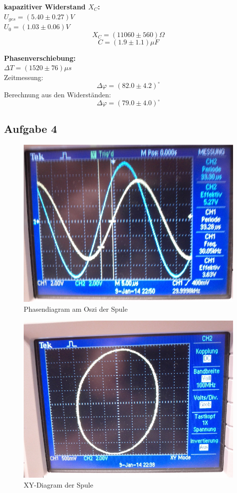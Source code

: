 \documentclass[12pt,a4paper]{article}
\begin{document}
\begin{multicols}{2}
\textbf{kapazitiver Widerstand $X_C$:}\\
$U_{ges}=(5.40 \pm 0.27)V$\\
$U_0=(1.03\pm 0.06)V$\\
$$X_C=(11060\pm 560)\Omega$$
$$C=(1.9\pm 1.1)\mu F$$

\textbf{Phasenverschiebung:}\\
$\Delta T = (1520\pm 76) \mu s$\\
Zeitmessung:
$$\Delta \varphi = (82.0 \pm 4.2)^\circ$$
Berechnung aus den Widerständen:
$$\Delta \varphi = (79.0 \pm 4.0)^\circ$$

\subsection{Aufgabe 4}
\begin{figure}[H]
	\centering
	\includegraphics[scale=0.25]{./figure/30kHz_spule.jpg}
	\caption{Phasendiagram am Oszi der Spule}
	\label{fig:phase_spule}
\end{figure}
\begin{figure}[H]
	\centering
	\includegraphics[scale=0.25]{./figure/XY_spule.jpg}
	\caption{XY-Diagram der Spule}
	\label{fig:xy_spule}
\end{figure}


\end{multicols}
\end{document}
